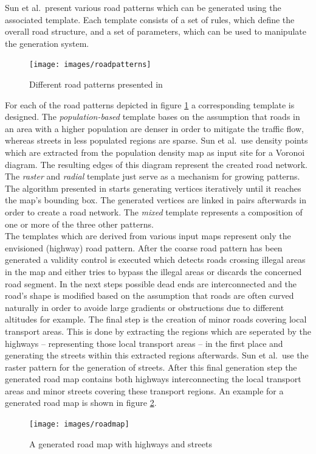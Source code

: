 \noindent
Sun et al.\ present various road patterns which can be generated using the associated template. Each template consists of a set of rules, which define the overall road structure, and a set of parameters, which can be used to manipulate the generation system.\\

\begin{figure}[H]
\begin{center}
\texttt{[image: images/roadpatterns]}
\end{center}
\caption{Different road patterns presented in \cite{sun02}}
\label{fig:roadpatterns}
\end{figure}

\noindent
For each of the road patterns depicted in figure \ref{fig:roadpatterns} a corresponding template is designed. The \emph{population-based} template bases on the assumption that roads in an area with a higher population are denser in order to mitigate the traffic flow, whereas streets in less populated regions are sparse. Sun et al.\ use density points which are extracted from the population density map as input site for a Voronoi diagram. The resulting edges of this diagram represent the created road network. The \emph{raster} and \emph{radial} template just serve as a mechanism for growing patterns. The algorithm presented in \cite{sun02} starts generating vertices iteratively until it reaches the map's bounding box. The generated vertices are linked in pairs afterwards in order to create a road network. The \emph{mixed} template represents a composition of one or more of the three other patterns.\\

\noindent
The templates which are derived from various input maps represent only the envisioned (highway) road pattern. After the coarse road pattern has been generated a validity control is executed which detects roads crossing illegal areas in the map and either tries to bypass the illegal areas or discards the concerned road segment. In the next steps possible dead ends are interconnected and the road's shape is modified based on the assumption that roads are often curved naturally in order to avoide large gradients or obstructions due to different altitudes for example. The final step is the creation of minor roads covering local transport areas. This is done by extracting the regions which are seperated by the highways -- representing those local transport areas -- in the first place and generating the streets within this extracted regions afterwards. Sun et al.\ use the raster pattern for the generation of streets. After this final generation step the generated road map contains both highways interconnecting the local transport areas and minor streets covering these transport regions. An example for a generated road map is shown in figure \ref{fig:roadmap}. \\

\begin{figure}[H]
\begin{center}
\texttt{[image: images/roadmap]}
\end{center}
\caption{A generated road map with highways and streets \cite{sun02}}
\label{fig:roadmap}
\end{figure}